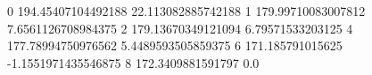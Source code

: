 0 194.45407104492188 22.113082885742188
1 179.99710083007812 7.6561126708984375
2 179.13670349121094 6.79571533203125
4 177.78994750976562 5.4489593505859375
6 171.185791015625 -1.1551971435546875
8 172.3409881591797 0.0

